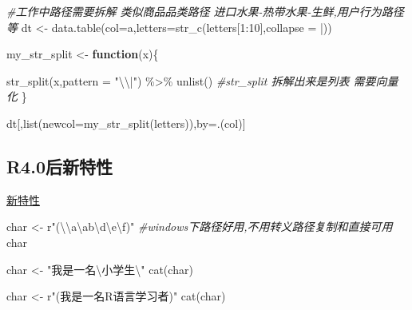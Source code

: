 \documentclass[
]{book}
\newenvironment{Shaded}{\begin{snugshade}}{\end{snugshade}}
\newcommand{\AttributeTok}[1]{\textcolor[rgb]{0.77,0.63,0.00}{#1}}
\newcommand{\CommentTok}[1]{\textcolor[rgb]{0.56,0.35,0.01}{\textit{#1}}}
\newcommand{\ControlFlowTok}[1]{\textcolor[rgb]{0.13,0.29,0.53}{\textbf{#1}}}
\newcommand{\DecValTok}[1]{\textcolor[rgb]{0.00,0.00,0.81}{#1}}
\newcommand{\FunctionTok}[1]{\textcolor[rgb]{0.00,0.00,0.00}{#1}}
\newcommand{\NormalTok}[1]{#1}
\newcommand{\OtherTok}[1]{\textcolor[rgb]{0.56,0.35,0.01}{#1}}
\newcommand{\SpecialCharTok}[1]{\textcolor[rgb]{0.00,0.00,0.00}{#1}}
\newcommand{\StringTok}[1]{\textcolor[rgb]{0.31,0.60,0.02}{#1}}
\begin{document}
\begin{Shaded}
\begin{Highlighting}[]

\CommentTok{\#工作中路径需要拆解 类似商品品类路径 进口水果{-}热带水果{-}生鲜,用户行为路径等}
\NormalTok{dt }\OtherTok{\textless{}{-}} \FunctionTok{data.table}\NormalTok{(}\AttributeTok{col=}\StringTok{\textquotesingle{}a\textquotesingle{}}\NormalTok{,}\AttributeTok{letters=}\FunctionTok{str\_c}\NormalTok{(letters[}\DecValTok{1}\SpecialCharTok{:}\DecValTok{10}\NormalTok{],}\AttributeTok{collapse =} \StringTok{\textquotesingle{}|\textquotesingle{}}\NormalTok{))}

\NormalTok{my\_str\_split }\OtherTok{\textless{}{-}} \ControlFlowTok{function}\NormalTok{(x)\{}
  
  \FunctionTok{str\_split}\NormalTok{(x,}\AttributeTok{pattern =} \StringTok{"}\SpecialCharTok{\textbackslash{}\textbackslash{}}\StringTok{|"}\NormalTok{) }\SpecialCharTok{\%\textgreater{}\%} \FunctionTok{unlist}\NormalTok{()  }\CommentTok{\#str\_split 拆解出来是列表 需要向量化}
\NormalTok{\}}

\NormalTok{dt[,}\FunctionTok{list}\NormalTok{(}\AttributeTok{newcol=}\FunctionTok{my\_str\_split}\NormalTok{(letters)),by}\OtherTok{=}\NormalTok{.(col)]}
\end{Highlighting}
\end{Shaded}

\hypertarget{r4.0ux540eux65b0ux7279ux6027}{%
\subsection{R4.0后新特性}\label{r4.0ux540eux65b0ux7279ux6027}}

\href{https://www.r-bloggers.com/4-for-4-0-0-four-useful-new-features-in-r-4-0-0/}{新特性}

\begin{Shaded}
\begin{Highlighting}[]
\NormalTok{char }\OtherTok{\textless{}{-}}\NormalTok{ r}\StringTok{"(}\SpecialCharTok{\textbackslash{}\textbackslash{}}\StringTok{a}\SpecialCharTok{\textbackslash{}a}\StringTok{b\textbackslash{}d}\SpecialCharTok{\textbackslash{}e\textbackslash{}f}\StringTok{)"} \CommentTok{\#windows下路径好用,不用转义路径复制和直接可用}
\NormalTok{char}
\end{Highlighting}
\end{Shaded}

\begin{Shaded}
\begin{Highlighting}[]
\NormalTok{char }\OtherTok{\textless{}{-}} \StringTok{"我是一名}\SpecialCharTok{\textbackslash{}\textquotesingle{}}\StringTok{小学生}\SpecialCharTok{\textbackslash{}\textquotesingle{}}\StringTok{"} 
\FunctionTok{cat}\NormalTok{(char)}

\NormalTok{char }\OtherTok{\textless{}{-}}\NormalTok{ r}\StringTok{"(我是一名\textquotesingle{}R语言\textquotesingle{}学习者)"}
\FunctionTok{cat}\NormalTok{(char)}
\end{Highlighting}
\end{Shaded}
\end{document}
